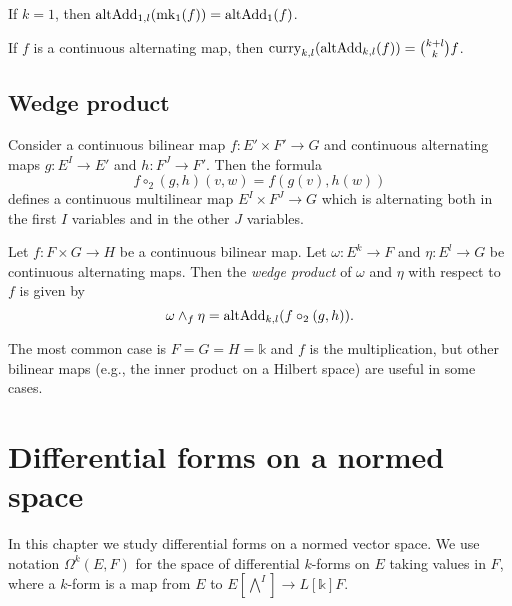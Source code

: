 \begin{theorem}
  If \(k = 1\), then \(\operatorname{altAdd}_{1, l}(\operatorname{mk_1}(f)) = \operatorname{altAdd}_{1}(f)\).
\end{theorem}

\begin{theorem}
  If \(f\) is a continuous alternating map, then \(\operatorname{curry}_{k, l}(\operatorname{altAdd}_{k, l}(f)) = \binom{k + l}{k}f\).
\end{theorem}

\section{Wedge product}%
\label{sec:wedge-product}

\begin{definition}
  Consider a continuous bilinear map \(f \colon E' \times F' \to G\)
  and continuous alternating maps \(g\colon E^{I}\to E'\) and \(h\colon F^{J}\to F'\).
  Then the formula
  \[
    f \circ_{2} (g, h)(v, w) = f(g(v), h(w))
  \]
  defines a continuous multilinear map \(E^{I}\times F^{J}\to G\)
  which is alternating both in the first \(I\) variables and in the other \(J\) variables.
\end{definition}

\begin{definition}
  Let \(f \colon F \times G \to H\) be a continuous bilinear map.
  Let \(\omega \colon E^{k} \to F\) and \(\eta\colon E^{l}\to G\) be continuous alternating maps.
  Then the \emph{wedge product} of \(\omega\) and \(\eta\) with respect to \(f\) is given by
  \[
    \omega \wedge_{f} \eta = \operatorname{altAdd}_{k, l}(f \circ_{2}(g, h)).
  \]
\end{definition}

The most common case is \(F = G = H = \mathbb k\) and \(f\) is the multiplication,
but other bilinear maps (e.g., the inner product on a Hilbert space) are useful in some cases.

\begin{theorem}
  
\end{theorem}

\chapter{Differential forms on a normed space}%
\label{cha:differential-forms-normed-space}

In this chapter we study differential forms on a normed vector space.
We use notation \(\Omega^{k}(E, F)\) for the space of differential \(k\)-forms on \(E\) taking values in \(F\),
where a \(k\)-form is a map from \(E\) to \(E [\bigwedge^{I}]\to L[\mathbb k] F\).

